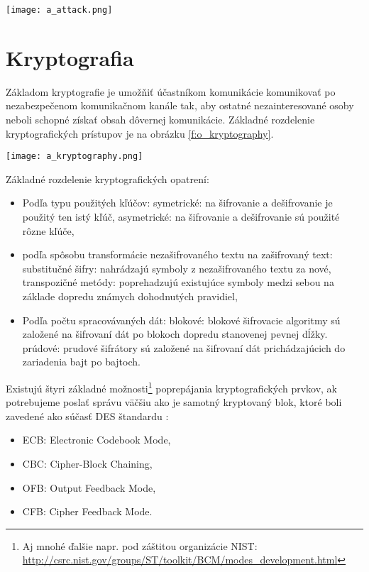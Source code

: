 \documentclass[12pt,a4wide,oneside,openright]{report}
\begin{document}
\begin{figure*}[h]
	\centering
	\texttt{[image: a\_attack.png]}
	\caption{Všeobecný priebeh útoku.
	\cite{bidgoli2006handbook}}
	\label{f:o_attack}
\end{figure*}

\section{Kryptografia} \label{s_cryptography}
Základom kryptografie je umožňiť účastníkom komunikácie komunikovať po nezabezpečenom komunikačnom kanále tak, aby ostatné nezainteresované osoby neboli schopné získať obsah dôvernej komunikácie\cite{cryptodef}. Základné rozdelenie kryptografických prístupov je na obrázku \ref{f:o_kryptography}.

\begin{figure*}[!htb]
	\centering
	\texttt{[image: a\_kryptography.png]}
	\caption{Rozdelenie kryptografických prístupov\cite{bidgoli2006handbook}.}
	\label{f:o_kryptography}
\end{figure*}

Základné rozdelenie kryptografických opatrení:
\singlespacing
\begin{itemize}
	\item Podľa typu použitých kľúčov:
		\subitem symetrické: na šifrovanie a dešifrovanie je použitý ten istý kľúč,
		\subitem asymetrické: na šifrovanie a dešifrovanie sú použité rôzne kľúče,
	\item podľa spôsobu transformácie nezašifrovaného textu na zašifrovaný text:
		\subitem substitučné šifry: nahrádzajú symboly z nezašifrovaného textu za nové,
		\subitem transpozičné metódy: poprehadzujú existujúce symboly medzi sebou na základe dopredu známych dohodnutých pravidiel,
	\item Podľa počtu spracovávaných dát:
		\subitem blokové: blokové šifrovacie algoritmy sú založené na šifrovaní dát po blokoch dopredu stanovenej pevnej dĺžky.
		\subitem prúdové: prudové šifrátory sú založené na šifrovaní dát prichádzajúcich do zariadenia bajt po bajtoch.
\end{itemize}
\onehalfspacing


Existujú štyri základné možnosti\footnote{Aj mnohé ďalšie napr. pod záštitou organizácie NIST: \url{http://csrc.nist.gov/groups/ST/toolkit/BCM/modes_development.html}} poprepájania kryptografických prvkov, ak potrebujeme poslať správu väčšiu ako je samotný kryptovaný blok, ktoré boli zavedené ako súčasť DES štandardu \cite{bidgoli2006handbook}:
\singlespacing
\begin{itemize}
	\item ECB: Electronic Codebook Mode,
	\item CBC: Cipher-Block Chaining,
	\item OFB: Output Feedback Mode,
	\item CFB: Cipher Feedback Mode.
\end{itemize}
\onehalfspacing
\end{document}
